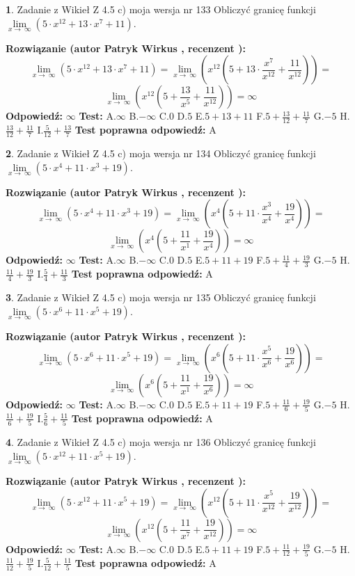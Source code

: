 \documentclass[12pt, a4paper]{article}
\theoremstyle{definition} %
\newtheorem{zad}{}
\newcommand{\zadStart}[1]{\begin{zad}#1\newline}
\newcommand{\zadStop}{\end{zad}}
\newcommand{\rozwStart}[2]{\noindent \textbf{Rozwiązanie (autor #1 , recenzent #2): }\newline}
\newcommand{\rozwStop}{\newline}
\newcommand{\odpStart}{\noindent \textbf{Odpowiedź:}\newline}
\newcommand{\odpStop}{\newline}
\newcommand{\testStart}{\noindent \textbf{Test:}\newline}
\newcommand{\testStop}{\newline}
\newcommand{\kluczStart}{\noindent \textbf{Test poprawna odpowiedź:}\newline}
\newcommand{\kluczStop}{\newline}
\begin{document}
\zadStart{Zadanie z Wikieł Z 4.5 c) moja wersja nr 133}
Obliczyć granicę funkcji  $\lim\limits_{x\to\ \infty}(5 \cdot x^{12}+13 \cdot x^{7}+11)$.
\zadStop
\rozwStart{Patryk Wirkus}{}
$$\lim\limits_{x\to\ \infty}(5 \cdot x^{12}+13 \cdot x^{7}+11) = \lim\limits_{x\to\ \infty}(x^{12}(5 +13 \cdot \frac{x^{7}}{x^{12}}+\frac{11}{x^{12}})) =$$ $$\lim\limits_{x\to\ \infty}(x^{12}(5 +\frac{13}{x^{5}}+\frac{11}{x^{12}})) =\infty$$
\rozwStop
\odpStart
$\infty$
\odpStop
\testStart
A.$\infty$ B.$-\infty$ C.$0$ D.$5$ E.$5 + 13 + 11$
F.$5+\frac{13}{12}+\frac{11}{7}$ G.$-5$
H.$\frac{13}{12}+\frac{11}{7}$
I.$\frac{5}{12}+\frac{13}{7}$
\testStop
\kluczStart
A
\kluczStop



\zadStart{Zadanie z Wikieł Z 4.5 c) moja wersja nr 134}
Obliczyć granicę funkcji  $\lim\limits_{x\to\ \infty}(5 \cdot x^{4}+11 \cdot x^{3}+19)$.
\zadStop
\rozwStart{Patryk Wirkus}{}
$$\lim\limits_{x\to\ \infty}(5 \cdot x^{4}+11 \cdot x^{3}+19) = \lim\limits_{x\to\ \infty}(x^{4}(5 +11 \cdot \frac{x^{3}}{x^{4}}+\frac{19}{x^{4}})) =$$ $$\lim\limits_{x\to\ \infty}(x^{4}(5 +\frac{11}{x^{1}}+\frac{19}{x^{4}})) =\infty$$
\rozwStop
\odpStart
$\infty$
\odpStop
\testStart
A.$\infty$ B.$-\infty$ C.$0$ D.$5$ E.$5 + 11 + 19$
F.$5+\frac{11}{4}+\frac{19}{3}$ G.$-5$
H.$\frac{11}{4}+\frac{19}{3}$
I.$\frac{5}{4}+\frac{11}{3}$
\testStop
\kluczStart
A
\kluczStop



\zadStart{Zadanie z Wikieł Z 4.5 c) moja wersja nr 135}
Obliczyć granicę funkcji  $\lim\limits_{x\to\ \infty}(5 \cdot x^{6}+11 \cdot x^{5}+19)$.
\zadStop
\rozwStart{Patryk Wirkus}{}
$$\lim\limits_{x\to\ \infty}(5 \cdot x^{6}+11 \cdot x^{5}+19) = \lim\limits_{x\to\ \infty}(x^{6}(5 +11 \cdot \frac{x^{5}}{x^{6}}+\frac{19}{x^{6}})) =$$ $$\lim\limits_{x\to\ \infty}(x^{6}(5 +\frac{11}{x^{1}}+\frac{19}{x^{6}})) =\infty$$
\rozwStop
\odpStart
$\infty$
\odpStop
\testStart
A.$\infty$ B.$-\infty$ C.$0$ D.$5$ E.$5 + 11 + 19$
F.$5+\frac{11}{6}+\frac{19}{5}$ G.$-5$
H.$\frac{11}{6}+\frac{19}{5}$
I.$\frac{5}{6}+\frac{11}{5}$
\testStop
\kluczStart
A
\kluczStop



\zadStart{Zadanie z Wikieł Z 4.5 c) moja wersja nr 136}
Obliczyć granicę funkcji  $\lim\limits_{x\to\ \infty}(5 \cdot x^{12}+11 \cdot x^{5}+19)$.
\zadStop
\rozwStart{Patryk Wirkus}{}
$$\lim\limits_{x\to\ \infty}(5 \cdot x^{12}+11 \cdot x^{5}+19) = \lim\limits_{x\to\ \infty}(x^{12}(5 +11 \cdot \frac{x^{5}}{x^{12}}+\frac{19}{x^{12}})) =$$ $$\lim\limits_{x\to\ \infty}(x^{12}(5 +\frac{11}{x^{7}}+\frac{19}{x^{12}})) =\infty$$
\rozwStop
\odpStart
$\infty$
\odpStop
\testStart
A.$\infty$ B.$-\infty$ C.$0$ D.$5$ E.$5 + 11 + 19$
F.$5+\frac{11}{12}+\frac{19}{5}$ G.$-5$
H.$\frac{11}{12}+\frac{19}{5}$
I.$\frac{5}{12}+\frac{11}{5}$
\testStop
\kluczStart
A
\kluczStop
\end{document}
